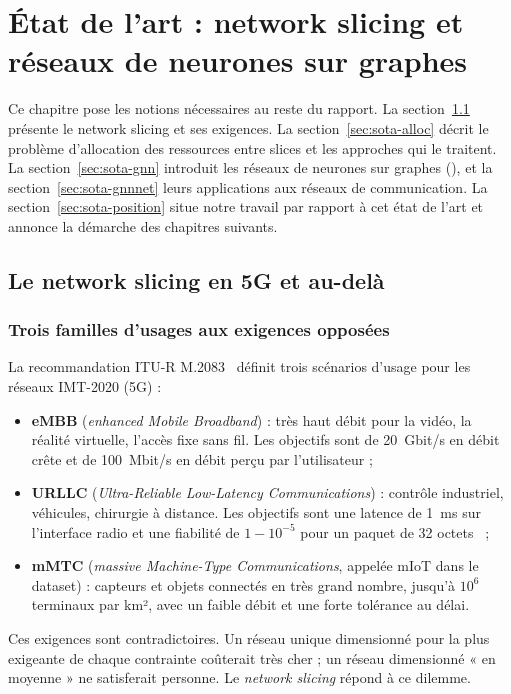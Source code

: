 \chapter{État de l'art : network slicing et réseaux de neurones sur graphes}\label{chap:sota}
Ce chapitre pose les notions nécessaires au reste du rapport. La section~\ref{sec:sota-slicing} présente le network slicing et ses exigences. La section~\ref{sec:sota-alloc} décrit le problème d'allocation des ressources entre slices et les approches qui le traitent. La section~\ref{sec:sota-gnn} introduit les réseaux de neurones sur graphes (\gnn), et la section~\ref{sec:sota-gnnnet} leurs applications aux réseaux de communication. La section~\ref{sec:sota-position} situe notre travail par rapport à cet état de l'art et annonce la démarche des chapitres suivants.

\section{Le network slicing en 5G et au-delà}\label{sec:sota-slicing}
\subsection{Trois familles d'usages aux exigences opposées}
La recommandation ITU-R M.2083~\cite{itu2083} définit trois scénarios d'usage pour les réseaux IMT-2020 (5G) :
\begin{itemize}
  \item \textbf{eMBB} (\emph{enhanced Mobile Broadband}) : très haut débit pour la vidéo, la réalité virtuelle, l'accès fixe sans fil. Les objectifs sont de 20~Gbit/s en débit crête et de 100~Mbit/s en débit perçu par l'utilisateur ;
  \item \textbf{URLLC} (\emph{Ultra-Reliable Low-Latency Communications}) : contrôle industriel, véhicules, chirurgie à distance. Les objectifs sont une latence de 1~ms sur l'interface radio et une fiabilité de $1-10^{-5}$ pour un paquet de 32 octets~\cite{tr38913} ;
  \item \textbf{mMTC} (\emph{massive Machine-Type Communications}, appelée mIoT dans le dataset) : capteurs et objets connectés en très grand nombre, jusqu'à $10^6$ terminaux par km², avec un faible débit et une forte tolérance au délai.
\end{itemize}
Ces exigences sont contradictoires. Un réseau unique dimensionné pour la plus exigeante de chaque contrainte coûterait très cher ; un réseau dimensionné « en moyenne » ne satisferait personne. Le \emph{network slicing} répond à ce dilemme.


